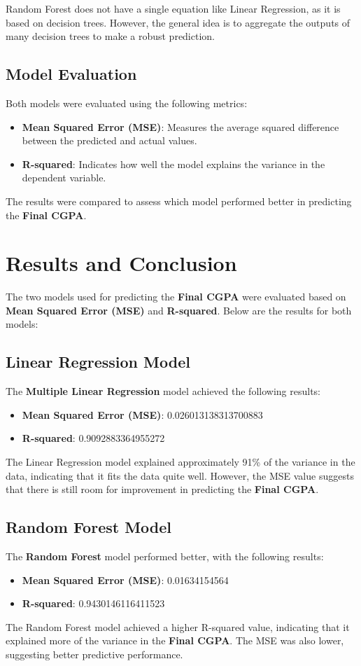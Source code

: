 \documentclass{article}
\begin{document}
Random Forest does not have a single equation like Linear Regression, as it is based on decision trees. However, the general idea is to aggregate the outputs of many decision trees to make a robust prediction.

\subsection{Model Evaluation}
Both models were evaluated using the following metrics:
\begin{itemize}
    \item \textbf{Mean Squared Error (MSE)}: Measures the average squared difference between the predicted and actual values.
    \item \textbf{R-squared}: Indicates how well the model explains the variance in the dependent variable.
\end{itemize}

The results were compared to assess which model performed better in predicting the \textbf{Final CGPA}.

\section{Results and Conclusion}

The two models used for predicting the \textbf{Final CGPA} were evaluated based on \textbf{Mean Squared Error (MSE)} and \textbf{R-squared}. Below are the results for both models:

\subsection{Linear Regression Model}
The \textbf{Multiple Linear Regression} model achieved the following results:
\begin{itemize}
    \item \textbf{Mean Squared Error (MSE)}: 0.026013138313700883
    \item \textbf{R-squared}: 0.9092883364955272
\end{itemize}
The Linear Regression model explained approximately 91\% of the variance in the data, indicating that it fits the data quite well. However, the MSE value suggests that there is still room for improvement in predicting the \textbf{Final CGPA}.

\subsection{Random Forest Model}
The \textbf{Random Forest} model performed better, with the following results:
\begin{itemize}
    \item \textbf{Mean Squared Error (MSE)}: 0.01634154564
    \item \textbf{R-squared}: 0.9430146116411523
\end{itemize}
The Random Forest model achieved a higher R-squared value, indicating that it explained more of the variance in the \textbf{Final CGPA}. The MSE was also lower, suggesting better predictive performance.
\end{document}
